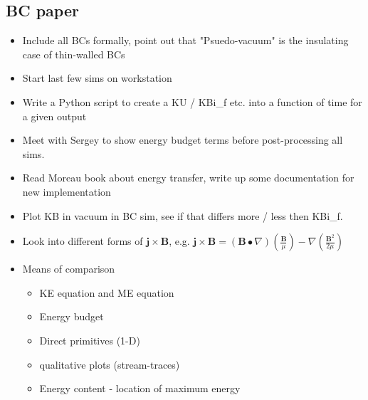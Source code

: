 \documentclass[11pt]{article}
\begin{document}
\subsection{BC paper}
\begin{itemize}
\setlength\itemsep{-1em}
\item Include all BCs formally, point out that "Psuedo-vacuum" is the insulating case of thin-walled BCs
\item Start last few sims on workstation
\item Write a Python script to create a KU / KBi\_f etc. into a function of time for a given output
\item Meet with Sergey to show energy budget terms before post-processing all sims.
\item Read Moreau book about energy transfer, write up some documentation for new implementation
\item Plot KB in vacuum in BC sim, see if that differs more / less then KBi\_f.
\item Look into different forms of $\mathbf{j}\times \mathbf{B}$, e.g. $\mathbf{j}\times \mathbf{B} = (\mathbf{B}\bullet\nabla) \left(\frac{\mathbf{B}}{\mu}\right) - \nabla \left( \frac{\mathbf{B}^2}{2\mu} \right)$
\item Means of comparison
\begin{itemize}
\setlength\itemsep{-1em}
\item KE equation and ME equation
\item Energy budget
\item Direct primitives (1-D)
\item qualitative plots (stream-traces)
\item Energy content - location of maximum energy
\end{itemize}
\end{itemize}
\end{document}
